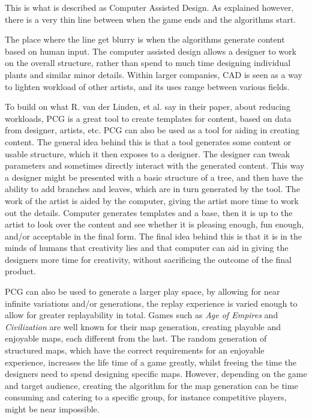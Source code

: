 This is what is described as Computer Assisted Design\cite{book:cad}. As explained however, there is a very thin line between when the game ends and the algorithms start. 

The place where the line get blurry is when the algorithms generate content based on human input. The computer assisted design allows a designer to work on the overall structure, rather than spend to much time designing individual plants and similar minor details.
Within larger companies, CAD is seen as a way to lighten workload of other artists, and its uses range between various fields.

To build on what R. van der Linden, et al. say in their paper, about reducing workloads, PCG is a great tool to create templates for content, based on data from designer, artists, etc. PCG can also be used as a tool for aiding in creating content.
The general idea behind this is that a tool generates some content or usable structure, which it then exposes to a designer. The designer can tweak parameters and sometimes directly interact with the generated content. This way a designer might be presented with a basic structure of a tree, and then have the ability to add branches and leaves, which are in turn generated by the tool. 
The work of the artist is aided by the computer, giving the artist more time to work out the details. Computer generates templates and a base, then it is up to the artist to look over the content and see whether it is pleasing enough, fun enough, and/or acceptable in the final form. The final idea behind this is that it is in the minds of humans that creativity lies and that computer can aid in giving the designers more time for creativity, without sacrificing the outcome of the final product. 

PCG can also be used to generate a larger play space, by allowing for near infinite variations and/or generations, the replay experience is varied enough to allow for greater replayability in total. Games such as \textit{Age of Empires} and \textit{Civilization} are well known for their map generation, creating playable and enjoyable maps, each different from the last. 
The random generation of structured maps, which have the correct requirements for an enjoyable experience, increases the life time of a game greatly, whilst freeing the time the designers need to spend designing specific maps. However, depending on the game and target audience, creating the algorithm for the map generation can be time consuming and catering to a specific group, for instance competitive players, might be near impossible.

